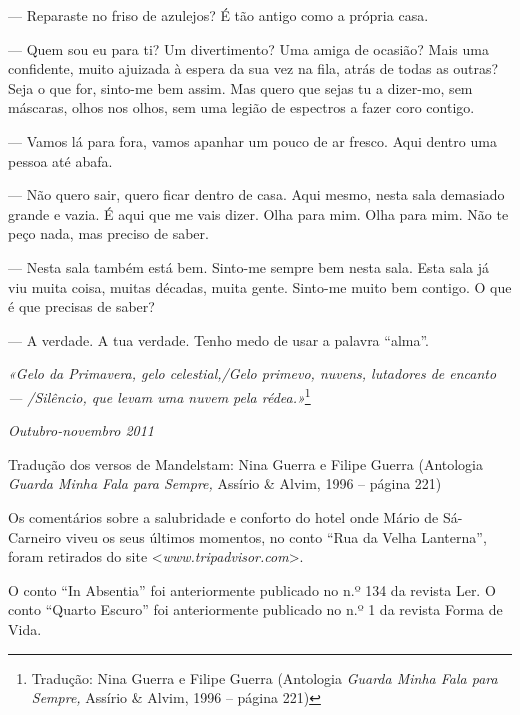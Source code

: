 --- Reparaste no friso de azulejos? É tão antigo como a própria casa.

--- Quem sou eu para ti? Um divertimento? Uma amiga de ocasião? Mais uma
  confidente, muito ajuizada à espera da sua vez na fila, atrás de todas
  as outras? Seja o que for, sinto-me bem assim. Mas quero que sejas tu
  a dizer-mo, sem máscaras, olhos nos olhos, sem uma legião de espectros
  a fazer coro contigo.

--- Vamos lá para fora, vamos apanhar um pouco de ar
fresco. Aqui dentro uma pessoa até abafa.

--- Não quero sair, quero ficar dentro de casa. Aqui mesmo, nesta sala
  demasiado grande e vazia. É aqui que me vais dizer. Olha para mim.
  Olha para mim. Não te peço nada, mas preciso de saber.

--- Nesta sala também está bem. Sinto-me sempre bem nesta sala. Esta sala
  já viu muita coisa, muitas décadas, muita gente. Sinto-me muito bem
  contigo. O que é que precisas de saber?

--- A verdade. A tua verdade. Tenho medo de usar a palavra ``alma''.

\emph{«Gelo da Primavera, gelo celestial,/Gelo primevo, nuvens,
lutadores de encanto --- /Silêncio, que levam uma nuvem pela
rédea.»}\footnote{Tradução: Nina Guerra e Filipe Guerra
(Antologia \emph{Guarda Minha Fala para Sempre, }Assírio \& Alvim, 1996
-- página 221)}

\begin{flushright}
\emph{Outubro-novembro 2011}
\end{flushright}

Tradução dos versos de Mandelstam: Nina Guerra e Filipe Guerra
(Antologia \emph{Guarda Minha Fala para Sempre, }Assírio \& Alvim, 1996
-- página 221)

Os comentários sobre a salubridade e conforto do hotel onde Mário de
Sá-Carneiro viveu os seus últimos momentos, no conto ``Rua da Velha
Lanterna'', foram retirados do site \textless{}\emph{www.tripadvisor.com}\textgreater{}.

O conto ``In Absentia'' foi anteriormente publicado no n.º 134 da
revista Ler. O conto ``Quarto Escuro'' foi anteriormente publicado no
n.º 1 da revista Forma de Vida.

